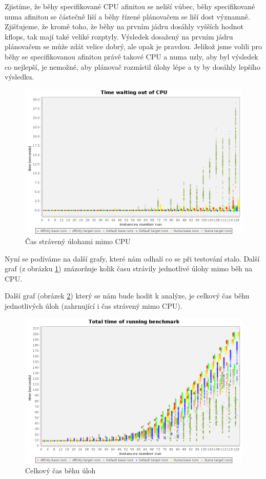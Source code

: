 \documentclass[a4paper,12pt]{article}
\begin{document}
Zjistíme, že běhy specifikované CPU afinitou se neliší vůbec, běhy specifikované numa afinitou se částečně liší a běhy řízené plánovačem se liší dost významně. Zjišťujeme, že kromě toho, že běhy na prvním jádru dosáhly vyšších hodnot kflops, tak mají také veliké rozptyly. Výsledek dosažený na prvním jádru plánovačem se může zdát velice dobrý, ale opak je pravdou. Jelikož jsme volili pro běhy se specifikovanou afinitou právě takové CPU a numa uzly, aby byl výsledek co nejlepší, je nemožné, aby plánovač rozmístil úlohy lépe a ty by dosáhly lepšího výsledku. 

\begin{figure}[ht]
\center
\includegraphics[scale=0.32]{obrazky/timeWaitingOutOfCPU.png}
\caption{Čas strávený úlohami mimo CPU}
\label{timeWaitingOutOfCPU}
\end{figure}

Nyní se podíváme na další grafy, které nám odhalí co se při testování stalo. Další graf (z obrázku \ref{timeWaitingOutOfCPU}) znázorňuje kolik času strávily jednotlivé úlohy mimo běh na CPU.

\newpage
Další graf (obrázek \ref{both kernels linpack results}) který se nám bude hodit k analýze, je celkový čas běhu jednotlivých úloh (zahrnující i čas strávený mimo CPU).

\begin{figure}[ht]
\center
\includegraphics[scale=0.32]{obrazky/totalTime.png}
\caption{Celkový čas běhu úloh}
\label{both kernels linpack results}
\end{figure}
\end{document}
